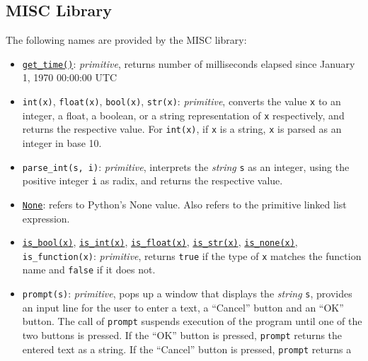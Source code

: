 \subsection*{MISC Library}

The following
names are provided by the MISC library:
\begin{itemize}
  \item
    \href{https://sourceacademy.org/sicpjs/1.2.6\#ex_1.22}{\lstinline{get_time()}}:
    \textit{primitive}, returns number of milliseconds elapsed since
    January 1, 1970 00:00:00 UTC
  \item \verb#int#\texttt{(x)}, \verb#float#\texttt{(x)},
    \verb#bool#\texttt{(x)}, \verb#str#\texttt{(x)}: \textit{primitive},
    converts the value \texttt{x} to an integer, a float, a boolean, or a string
    representation of \texttt{x} respectively, and returns the
    respective value. For \verb#int#\texttt{(x)}, if \texttt{x} is a string,
    \texttt{x} is parsed
    as an integer in base 10.
  \item \verb#parse_int#\texttt{(s, i)}: \textit{primitive},
    interprets the \emph{string} \texttt{s} as an integer, using the
    positive integer \texttt{i} as radix, and returns the respective value.
  \item
    \href{https://sourceacademy.org/sicpjs/2.4.3\#p6}{\texttt{None}}:
    refers to Python's None value. Also refers to the primitive
    linked list expression.
  \item
    \href{https://sourceacademy.org/sicpjs/4.1.2\#p2}{\lstinline{is_bool(x)}},
    \href{https://sourceacademy.org/sicpjs/2.3.2\#p5}{\lstinline{is_int(x)}},
    \href{https://sourceacademy.org/sicpjs/2.3.2\#p5}{\lstinline{is_float(x)}},
    \href{https://sourceacademy.org/sicpjs/2.3.2\#p7}{\lstinline{is_str(x)}},
    \href{https://sourceacademy.org/sicpjs/4.1.2\#p2}{\lstinline{is_none(x)}},
    \verb#is_function#\texttt{(x)}: \textit{primitive}, returns
    \texttt{true} if the type of \texttt{x} matches the function name
    and \texttt{false} if it does not.
  \item \texttt{prompt(s)}: \textit{primitive}, pops up a window that
    displays the \emph{string} \texttt{s}, provides
    an input line for the user to enter a text, a ``Cancel'' button
    and an ``OK'' button. The call of \texttt{prompt}
    suspends execution of the program until one of the two buttons is
    pressed. If
    the ``OK'' button is pressed, \texttt{prompt} returns the entered
    text as a string.
    If the ``Cancel'' button is pressed, \texttt{prompt} returns a

\end{itemize}
